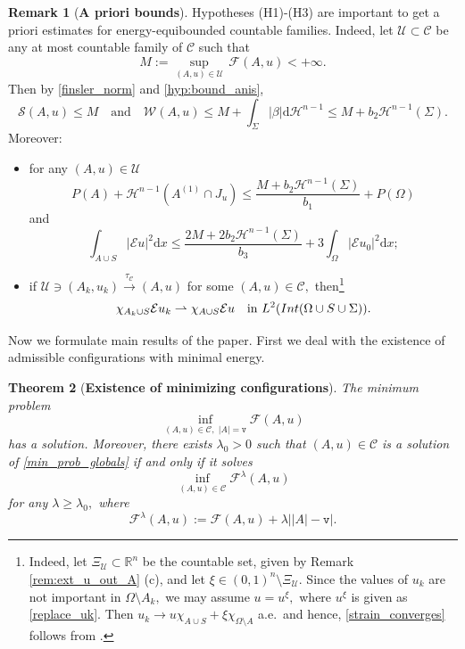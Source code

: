 \documentclass[reqno]{amsart}
\numberwithin{equation}{section}
\theoremstyle{plain}
\newtheorem{theorem}{Theorem}[section]
\theoremstyle{definition}
\newtheorem{remark}[theorem]{Remark}
\newcommand{\R}{\mathbb{R}}
\newcommand{\fm}{\mathtt{v}}
\newcommand{\cH}{\mathcal{H}}
\newcommand{\cS}{\mathcal{S}}
\newcommand{\cF}{\mathcal{F}}
\newcommand{\cW}{\mathcal{W}}
\newcommand{\cU}{\mathcal{U}}
\newcommand{\wk}{\rightharpoonup}
\newcommand{\bound}{b}
\renewcommand{\d}{\mathrm{d}}
\newcommand{\str}[1]{\mathcal{E}#1}
\newcommand{\admissible}{\mathcal{C}}
\newcommand{\substrate}{S}
\newcommand{\Ins}[1]{{\rm Int}{(#1\cup \substrate\cup \Sigma)}}
\begin{document}
\begin{remark}[\textbf{A priori bounds}]\label{rem:apriori_bounds_seq}
Hypotheses (H1)-(H3) are important to get a priori estimates for energy-equibounded countable families. 
Indeed, let $\mathcal{U}\subset \admissible$ be any at most countable family of $\admissible$ such that  
$$
M:=\sup\limits_{(A,u)\in\mathcal{U}}\, \cF(A,u)<+\infty. 
$$
Then by \eqref{finsler_norm} and \eqref{hyp:bound_anis},
%
\begin{equation*}
\cS(A,u) \le M\quad\text{and}\quad \cW(A,u) \le M + \int_\Sigma |\beta|\d\cH^{n-1} \le M + \bound_2\cH^{n-1}(\Sigma). 
\end{equation*}
Moreover:
\begin{itemize}
\item[(i)]  for any $(A,u)\in\mathcal{U}$
$$
P(A) + \cH^{n-1}(A^{(1)}\cap J_u) \le \frac{M+\bound_2\cH^{n-1}(\Sigma)}{\bound_1} +P(\Omega)   
$$
and
$$
\int_{A\cup\substrate} |\str{u}|^2\d x \le  \frac{2M+2\bound_2\cH^{n-1}(\Sigma)}{\bound_3} + 3\int_{\Omega} |\str{u_0}|^2 \d x ;
$$

\item[(ii)] if $\cU\ni (A_k,u_k)\overset{\tau_\admissible}{\to}(A,u)$ for some $(A,u)\in\admissible,$ then\footnote{Indeed, let $\Xi_\cU\subset\R^n$ be the countable set,   given by Remark \ref{rem:ext_u_out_A} (c), and let $\xi\in (0,1)^n\setminus \Xi_\cU.$ Since the values of $u_k$ are not important in $\Omega\setminus A_k,$ we may assume  $u = u^\xi,$ where $  u^\xi$ is given as \eqref{replace_uk}. Then $u_k\to u\chi_{A\cup S}+\xi\chi_{\Omega\setminus A}$ a.e.\   and hence, \eqref{strain_converges} follows from \cite[Theorem 1.1]{ChC:2020_jems}.} 
\begin{equation}\label{strain_converges}
\chi_{A_k\cup S}\str{u_k} \wk \chi_{A\cup S}\str{u}\quad\text{in $L^2(\Ins{\Omega})$.}
\end{equation} 

\end{itemize}
 
\end{remark}
 

Now we formulate main results of the paper. First we deal with the existence of admissible configurations with minimal energy.

\begin{theorem}[\textbf{Existence  of minimizing configurations}]\label{teo:global_existence}
The minimum problem 
\begin{equation}\label{min_prob_globals}
\inf\limits_{(A,u)\in \admissible,\,\,|A| = \fm} \cF(A,u)  
\end{equation}
%
has a solution. Moreover, there exists $\lambda_0>0$ such that $(A,u)\in\admissible$ is a solution of \eqref{min_prob_globals} if and only if it solves  
\begin{equation}\label{min_prob_globals_uncons}
\inf\limits_{(A,u)\in \admissible} \cF^\lambda(A,u)
\end{equation}
%
for any $\lambda\ge \lambda_0,$ where  
$$
\cF^\lambda(A,u):=\cF(A,u) +\lambda\big||A| - \fm\big|.
$$
\end{theorem}
\end{document}
